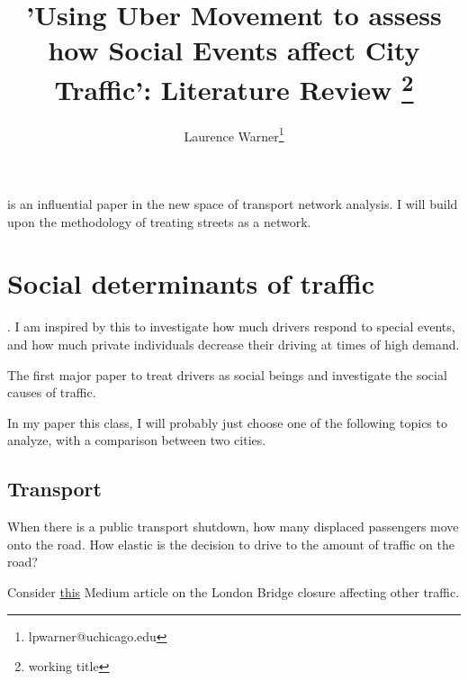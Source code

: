 \documentclass[11pt, oneside]{article}
\begin{document}
\begin{titlepage}
\title{'Using Uber Movement to assess how Social Events affect City Traffic': Literature Review \thanks{working title}}

\author{Laurence Warner\thanks{lpwarner@uchicago.edu}}
\date{}
\maketitle

\end{titlepage}

\begin{spacing}{2}

\autocite{turner2007axial} is an influential paper in the new space of transport network analysis. I will build upon the methodology of treating streets as a network.

\section{Social determinants of traffic}

\autocite{10.2307/1911814} . I am inspired by this to investigate how much drivers respond to special events, and how much private individuals decrease their driving at times of high demand.

\autocite{10.1007/3-540-48238-5_28} The first major paper to treat drivers as social beings and investigate the social causes of traffic.

In my paper this class, I will probably just choose one of the following topics to analyze, with a comparison between two cities.

\subsection{Transport}

When there is a public transport shutdown, how many displaced passengers move onto the road. How elastic is the decision to drive to the amount of traffic on the road?

Consider \href{https://medium.com/uber-movement/examining-the-impact-of-the-london-tower-bridge-closure-5b7626e44915?lang=en-US}{this} Medium article on the London Bridge closure affecting other traffic.


\newpage
\printbibliography

\end{spacing}
\end{document}
